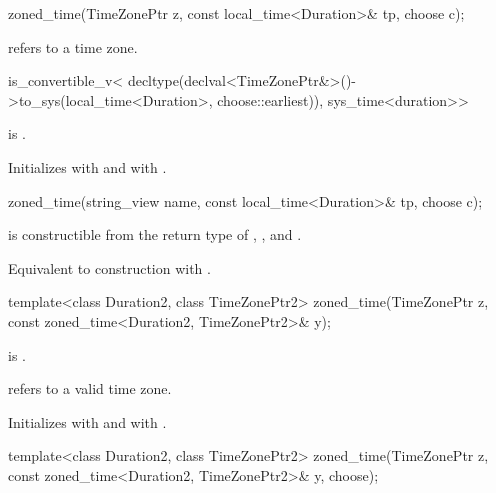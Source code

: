 \begin{itemdecl}
zoned_time(TimeZonePtr z, const local_time<Duration>& tp, choose c);
\end{itemdecl}

\begin{itemdescr}
\pnum
\expects
{} refers to a time zone.

\pnum
\constraints
\begin{codeblock}
is_convertible_v<
  decltype(declval<TimeZonePtr&>()->to_sys(local_time<Duration>{}, choose::earliest)),
  sys_time<duration>>
\end{codeblock}
is .

\pnum
\effects
Initializes  with  and  with .
\end{itemdescr}

\begin{itemdecl}
zoned_time(string_view name, const local_time<Duration>& tp, choose c);
\end{itemdecl}

\begin{itemdescr}
\pnum
\constraints
{} is constructible from
the return type of , , and .

\pnum
\effects
Equivalent to construction with .
\end{itemdescr}

\begin{itemdecl}
template<class Duration2, class TimeZonePtr2>
  zoned_time(TimeZonePtr z, const zoned_time<Duration2, TimeZonePtr2>& y);
\end{itemdecl}

\begin{itemdescr}
\pnum
\constraints
{} is .

\pnum
\expects
{} refers to a valid time zone.

\pnum
\effects
Initializes  with  and  with .
\end{itemdescr}

\begin{itemdecl}
template<class Duration2, class TimeZonePtr2>
  zoned_time(TimeZonePtr z, const zoned_time<Duration2, TimeZonePtr2>& y, choose);
\end{itemdecl}

